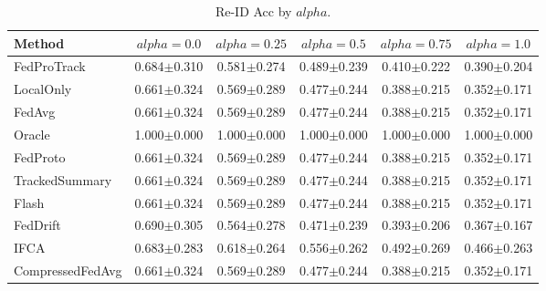 \begin{table}[t]
\centering
\caption{Re-ID Acc by $alpha$.}
\label{tab:alpha_concept_re_id_accuracy}
\begin{tabular}{lccccc}
\toprule
Method & $alpha=0.0$ & $alpha=0.25$ & $alpha=0.5$ & $alpha=0.75$ & $alpha=1.0$ \\
\midrule
FedProTrack & 0.684$\pm$0.310 & 0.581$\pm$0.274 & 0.489$\pm$0.239 & 0.410$\pm$0.222 & 0.390$\pm$0.204 \\
LocalOnly & 0.661$\pm$0.324 & 0.569$\pm$0.289 & 0.477$\pm$0.244 & 0.388$\pm$0.215 & 0.352$\pm$0.171 \\
FedAvg & 0.661$\pm$0.324 & 0.569$\pm$0.289 & 0.477$\pm$0.244 & 0.388$\pm$0.215 & 0.352$\pm$0.171 \\
Oracle & 1.000$\pm$0.000 & 1.000$\pm$0.000 & 1.000$\pm$0.000 & 1.000$\pm$0.000 & 1.000$\pm$0.000 \\
FedProto & 0.661$\pm$0.324 & 0.569$\pm$0.289 & 0.477$\pm$0.244 & 0.388$\pm$0.215 & 0.352$\pm$0.171 \\
TrackedSummary & 0.661$\pm$0.324 & 0.569$\pm$0.289 & 0.477$\pm$0.244 & 0.388$\pm$0.215 & 0.352$\pm$0.171 \\
Flash & 0.661$\pm$0.324 & 0.569$\pm$0.289 & 0.477$\pm$0.244 & 0.388$\pm$0.215 & 0.352$\pm$0.171 \\
FedDrift & 0.690$\pm$0.305 & 0.564$\pm$0.278 & 0.471$\pm$0.239 & 0.393$\pm$0.206 & 0.367$\pm$0.167 \\
IFCA & 0.683$\pm$0.283 & 0.618$\pm$0.264 & 0.556$\pm$0.262 & 0.492$\pm$0.269 & 0.466$\pm$0.263 \\
CompressedFedAvg & 0.661$\pm$0.324 & 0.569$\pm$0.289 & 0.477$\pm$0.244 & 0.388$\pm$0.215 & 0.352$\pm$0.171 \\
\bottomrule
\end{tabular}
\end{table}